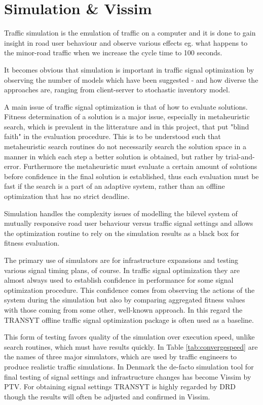 \section{Simulation \& Vissim}
\label{simulation}
Traffic simulation is the emulation of traffic on a computer and it is done to gain insight in road user behaviour and observe various effects eg. what happens to the minor-road traffic when we increase the cycle time to 100 seconds.

It becomes obvious that simulation is important in traffic signal optimization by observing the number of models which have been suggested - and how diverse the approaches are, ranging from client-server to stochastic inventory model.

A main issue of traffic signal optimization is that of how to evaluate solutions. Fitness determination of a solution is a major issue, especially in metaheuristic search, which is prevalent in the litterature and in this project, that put "blind faith" in the evaluation procedure. This is to be understood such that metaheuristic search routines do not necessarily search the solution space in a manner in which each step a better solution is obtained, but rather by trial-and-error. 
Furthermore the metaheuristic must evaluate a certain amount of solutions before confidence in the final solution is established, thus each evaluation must be fast if the search is a part of an adaptive system, rather than an offline optimization that has no strict deadline.

Simulation handles the complexity issues of modelling the bilevel system of mutually responsive road user behaviour versus traffic signal settings and allows the optimization routine to rely on the simulation results as a black box for fitness evaluation. 

The primary use of simulators are for infrastructure expansions and testing various signal timing plans, of course. In traffic signal optimization they are almost always used to establish confidence in performance for some signal optimization procedure. This confidence comes from observing the actions of the system during the simulation but also by comparing aggregated fitness values with those coming from some other, well-known approach. In this regard the TRANSYT offline traffic signal optimization package is often used as a baseline. 

This form of testing favors quality of the simulation over execution speed, unlike search routines, which must have results quickly. 
In Table \ref{tab:convergespeed} are the names of three major simulators, which are used by traffic engineers to produce realistic traffic simulations. 
In Denmark the de-facto simulation tool for final testing of signal settings and infrastructure changes has become Vissim by PTV. For obtaining signal settings TRANSYT is highly regarded by DRD though the results will often be adjusted and confirmed in Vissim.


